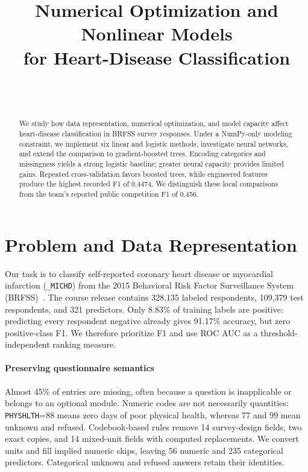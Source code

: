 \documentclass[10pt,conference,compsocconf]{IEEEtran}
\begin{document}
\title{Numerical Optimization and Nonlinear Models\\
for Heart-Disease Classification}
\author{\paperauthors\\\paperaffiliation\\\papercontact}
\maketitle

\begin{abstract}
We study how data representation, numerical optimization, and model capacity
affect heart-disease classification in BRFSS survey responses. Under a
NumPy-only modeling constraint, we implement six linear and logistic methods,
investigate neural networks, and extend the comparison to gradient-boosted
trees. Encoding categories and missingness yields a strong logistic baseline;
greater neural capacity provides limited gains. Repeated cross-validation
favors boosted trees, while engineered features produce the highest recorded
F1 of 0.4474. We distinguish these local comparisons from the team's reported
public competition F1 of 0.456.
\end{abstract}

\section{Problem and Data Representation}
Our task is to classify self-reported coronary heart disease or myocardial
infarction (\texttt{\_MICHD}) from the 2015 Behavioral Risk Factor Surveillance
System (BRFSS)~\cite{cdc2015}. The course release contains 328,135 labeled
respondents, 109,379 test respondents, and 321 predictors. Only 8.83\% of
training labels are positive: predicting every respondent negative already
gives 91.17\% accuracy, but zero positive-class F1. We therefore prioritize F1
and use ROC AUC as a threshold-independent ranking measure.

\paragraph{Preserving questionnaire semantics}
Almost 45\% of entries are missing, often because a question is inapplicable
or belongs to an optional module. Numeric codes are not necessarily
quantities: \texttt{PHYSHLTH}=88 means zero days of poor physical health,
whereas 77 and 99 mean unknown and refused. Codebook-based rules remove
14 survey-design fields, two exact copies, and 14 mixed-unit fields with
computed replacements. We convert units and fill implied numeric skips,
leaving 56 numeric and 235 categorical predictors. Categorical unknown and
refused answers retain their identities.
\end{document}

